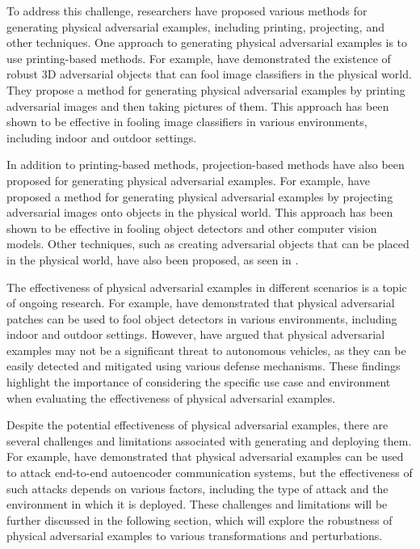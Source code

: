 \documentclass[11pt,a4paper]{article}
\begin{document}
To address this challenge, researchers have proposed various methods for generating physical adversarial examples, including printing, projecting, and other techniques. One approach to generating physical adversarial examples is to use printing-based methods. For example, \cite{arxiv:1707.08945} have demonstrated the existence of robust 3D adversarial objects that can fool image classifiers in the physical world. They propose a method for generating physical adversarial examples by printing adversarial images and then taking pictures of them. This approach has been shown to be effective in fooling image classifiers in various environments, including indoor and outdoor settings.

In addition to printing-based methods, projection-based methods have also been proposed for generating physical adversarial examples. For example, \cite{arxiv:1904.00759} have proposed a method for generating physical adversarial examples by projecting adversarial images onto objects in the physical world. This approach has been shown to be effective in fooling object detectors and other computer vision models. Other techniques, such as creating adversarial objects that can be placed in the physical world, have also been proposed, as seen in \cite{doi:10.1007/978-3-030-10925-7_4}.

The effectiveness of physical adversarial examples in different scenarios is a topic of ongoing research. For example, \cite{arxiv:1906.11897} have demonstrated that physical adversarial patches can be used to fool object detectors in various environments, including indoor and outdoor settings. However, \cite{arxiv:1707.03501} have argued that physical adversarial examples may not be a significant threat to autonomous vehicles, as they can be easily detected and mitigated using various defense mechanisms. These findings highlight the importance of considering the specific use case and environment when evaluating the effectiveness of physical adversarial examples.

Despite the potential effectiveness of physical adversarial examples, there are several challenges and limitations associated with generating and deploying them. For example, \cite{doi:10.1109/lcomm.2019.2901469} have demonstrated that physical adversarial examples can be used to attack end-to-end autoencoder communication systems, but the effectiveness of such attacks depends on various factors, including the type of attack and the environment in which it is deployed. These challenges and limitations will be further discussed in the following section, which will explore the robustness of physical adversarial examples to various transformations and perturbations.
\end{document}
